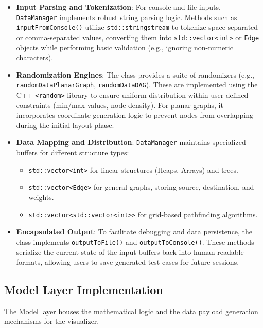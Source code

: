 \begin{itemize}
    \item \textbf{Input Parsing and Tokenization}: For console and file inputs, \texttt{DataManager} implements robust string parsing logic. Methods such as \texttt{inputFromConsole()} utilize \texttt{std::stringstream} to tokenize space-separated or comma-separated values, converting them into \texttt{std::vector<int>} or \texttt{Edge} objects while performing basic validation (e.g., ignoring non-numeric characters).
    
    \item \textbf{Randomization Engines}: The class provides a suite of randomizers (e.g., \texttt{randomDataPlanarGraph}, \texttt{randomDataDAG}). These are implemented using the C++ \texttt{<random>} library to ensure uniform distribution within user-defined constraints (min/max values, node density). For planar graphs, it incorporates coordinate generation logic to prevent nodes from overlapping during the initial layout phase.
    
    \item \textbf{Data Mapping and Distribution}: \texttt{DataManager} maintains specialized buffers for different structure types:
    \begin{itemize}
        \item \texttt{std::vector<int>} for linear structures (Heaps, Arrays) and trees.
        \item \texttt{std::vector<Edge>} for general graphs, storing source, destination, and weights.
        \item \texttt{std::vector<std::vector<int>>} for grid-based pathfinding algorithms.
    \end{itemize}
    
    \item \textbf{Encapsulated Output}: To facilitate debugging and data persistence, the class implements \texttt{outputToFile()} and \texttt{outputToConsole()}. These methods serialize the current state of the input buffers back into human-readable formats, allowing users to save generated test cases for future sessions.
\end{itemize}

\subsection{Model Layer Implementation}

The Model layer houses the mathematical logic and the data payload generation mechanisms for the visualizer.

